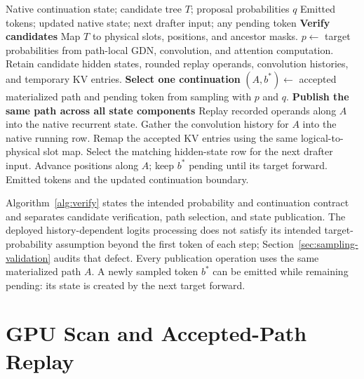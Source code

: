 \documentclass[conference]{IEEEtran}
\begin{document}
\begin{algorithm*}[t]
\caption{Tree verification and native continuation}
\label{alg:verify}
\normalsize\linespread{1.08}\selectfont\raggedright
\begin{algorithmic}[1]
\Require Native continuation state; candidate tree $T$; proposal probabilities $q$
\Ensure Emitted tokens; updated native state; next drafter input; any pending token
\Statex \textbf{Verify candidates}
\State Map $T$ to physical slots, positions, and ancestor masks.
\State $p\gets$ target probabilities from path-local GDN, convolution, and attention computation.
\State Retain candidate hidden states, rounded replay operands, convolution histories, and temporary KV entries.
\Statex \textbf{Select one continuation}
\State $(A,b^*)\gets$ accepted materialized path and pending token from sampling with $p$ and $q$.
\Statex \textbf{Publish the same path across all state components}
  \State Replay recorded operands along $A$ into the native recurrent state.
  \State Gather the convolution history for $A$ into the native running row.
\EndFor
\State Remap the accepted KV entries using the same logical-to-physical slot map.
\State Select the matching hidden-state row for the next drafter input.
\State Advance positions along $A$; keep $b^*$ pending until its target forward.
\State \Return Emitted tokens and the updated continuation boundary.
\end{algorithmic}
\end{algorithm*}

Algorithm~\ref{alg:verify} states the intended probability and continuation contract and separates candidate verification, path selection, and state publication. The deployed history-dependent logits processing does not satisfy its intended target-probability assumption beyond the first token of each step; Section~\ref{sec:sampling-validation} audits that defect. Every publication operation uses the same materialized path $A$. A newly sampled token $b^*$ can be emitted while remaining pending: its state is created by the next target forward.

\section{GPU Scan and Accepted-Path Replay}
\label{sec:kernel}
\end{document}
